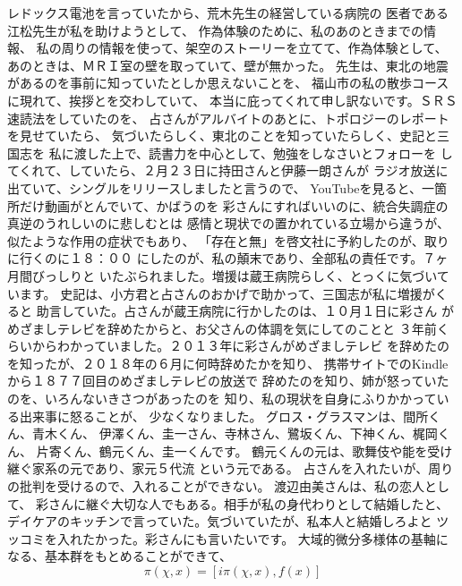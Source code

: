 \documentclass{jsarticle}
\begin{document}
{   レドックス電池を言っていたから、荒木先生の経営している病院の
   医者である江松先生が私を助けようとして、
   作為体験のために、私のあのときまでの情報、
   私の周りの情報を使って、架空のストーリーを立てて、作為体験として、
   あのときは、ＭＲＩ室の壁を取っていて、壁が無かった。
   先生は、東北の地震があるのを事前に知っていたとしか思えないことを、
   福山市の私の散歩コースに現れて、挨拶とを交わしていて、
   本当に庇ってくれて申し訳ないです。ＳＲＳ速読法をしていたのを、
   占さんがアルバイトのあとに、トポロジーのレポートを見せていたら、
   気づいたらしく、東北のことを知っていたらしく、史記と三国志を
   私に渡した上で、読書力を中心として、勉強をしなさいとフォローを
   してくれて、していたら、２月２３日に持田さんと伊藤一朗さんが
   ラジオ放送に出ていて、シングルをリリースしましたと言うので、
   YouTubeを見ると、一箇所だけ動画がとんでいて、かばうのを
   彩さんにすればいいのに、統合失調症の真逆のうれしいのに悲しむとは
   感情と現状での置かれている立場から違うが、似たような作用の症状でもあり、
   「存在と無」を啓文社に予約したのが、取りに行くのに１８：００
   にしたのが、私の顛末であり、全部私の責任です。７ヶ月間びっしりと
   いたぶられました。増援は蔵王病院らしく、とっくに気づいています。
   史記は、小方君と占さんのおかげで助かって、三国志が私に増援がくると
   助言していた。占さんが蔵王病院に行かしたのは、１０月１日に彩さん
   がめざましテレビを辞めたからと、お父さんの体調を気にしてのことと
   ３年前くらいからわかっていました。２０１３年に彩さんがめざましテレビ
   を辞めたのを知ったが、２０１８年の６月に何時辞めたかを知り、
   携帯サイトでのKindleから１８７７回目のめざましテレビの放送で
   辞めたのを知り、姉が怒っていたのを、いろんないきさつがあったのを
   知り、私の現状を自身にふりかかっている出来事に怒ることが、
   少なくなりました。
   グロス・グラスマンは、間所くん、青木くん、
   伊澤くん、圭一さん、寺林さん、鷺坂くん、下神くん、梶岡くん、
   片寄くん、鶴元くん、圭一くんです。
   鶴元くんの元は、歌舞伎や能を受け継ぐ家系の元であり、家元５代流
   という元である。
   占さんを入れたいが、周りの批判を受けるので、入れることができない。
   渡辺由美さんは、私の恋人として、
   彩さんに継ぐ大切な人でもある。相手が私の身代わりとして結婚したと、
   デイケアのキッチンで言っていた。気づいていたが、私本人と結婚しろよと
   ツッコミを入れたかった。彩さんにも言いたいです。
   大域的微分多様体の基軸になる、基本群をもとめることができて、
   $$ \pi(\chi,x) = [i\pi(\chi,x), f(x)] $$
   
}
\end{document}
